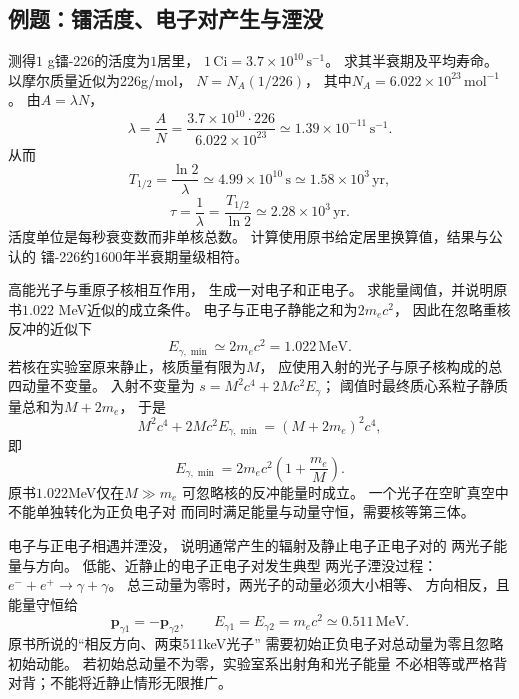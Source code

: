 \subsection{例题：镭活度、电子对产生与湮没}

\problemtext 测得$1$ g镭-226的活度为$1$居里，
$1\,\mathrm{Ci}=3.7\times10^{10}\,\mathrm{s^{-1}}$。
求其半衰期及平均寿命。
\workings
以摩尔质量近似为226g/mol，
$N=N_A(1/226)$，
其中$N_A=6.022\times10^{23}\,\mathrm{mol^{-1}}$。
由$A=\lambda N$，
\[
 \lambda=\frac{A}{N}
 =\frac{3.7\times10^{10}\cdot226}{6.022\times10^{23}}
 \simeq1.39\times10^{-11}\,\mathrm{s^{-1}}.
\]
从而
\[
 \boxed{T_{1/2}=\frac{\ln2}{\lambda}
 \simeq4.99\times10^{10}\,\mathrm s
 \simeq1.58\times10^3\,\mathrm{yr}},
\]
\[
 \boxed{\tau=\frac1\lambda
 =\frac{T_{1/2}}{\ln2}
 \simeq2.28\times10^3\,\mathrm{yr}}.
\]
\crosscheck 活度单位是每秒衰变数而非单核总数。
计算使用原书给定居里换算值，结果与公认的
镭-226约1600年半衰期量级相符。

\problemtext 高能光子与重原子核相互作用，
生成一对电子和正电子。
求能量阈值，并说明原书$1.022$ MeV近似的成立条件。
\workings
电子与正电子静能之和为$2m_ec^2$，
因此在忽略重核反冲的近似下
\[
 \boxed{E_{\gamma,\min}\simeq2m_ec^2
 =1.022\,\mathrm{MeV}}.
\]
若核在实验室原来静止，核质量有限为$M$，
应使用入射的光子与原子核构成的总四动量不变量。
入射不变量为
$s=M^2c^4+2Mc^2E_\gamma$；
阈值时最终质心系粒子静质量总和为$M+2m_e$，
于是
\[
 M^2c^4+2Mc^2E_{\gamma,\min}
 =(M+2m_e)^2c^4,
\]
即
\[
 \boxed{E_{\gamma,\min}
 =2m_ec^2\left(1+\frac{m_e}{M}\right)}.
\]
\crosscheck 原书$1.022$MeV仅在$M\gg m_e$
可忽略核的反冲能量时成立。
一个光子在空旷真空中不能单独转化为正负电子对
而同时满足能量与动量守恒，需要核等第三体。

\problemtext 电子与正电子相遇并湮没，
说明通常产生的辐射及静止电子正电子对的
两光子能量与方向。
\workings
低能、近静止的电子正电子对发生典型
两光子湮没过程：
$e^-+e^+\to\gamma+\gamma$。
总三动量为零时，两光子的动量必须大小相等、
方向相反，且能量守恒给
\[
 \boxed{\bm p_{\gamma1}=-\bm p_{\gamma2}},
 \qquad
 \boxed{E_{\gamma1}=E_{\gamma2}
 =m_ec^2\simeq0.511\,\mathrm{MeV}}.
\]
\crosscheck 原书所说的“相反方向、两束511keV光子”
需要初始正负电子对总动量为零且忽略初始动能。
若初始总动量不为零，实验室系出射角和光子能量
不必相等或严格背对背；不能将近静止情形无限推广。
